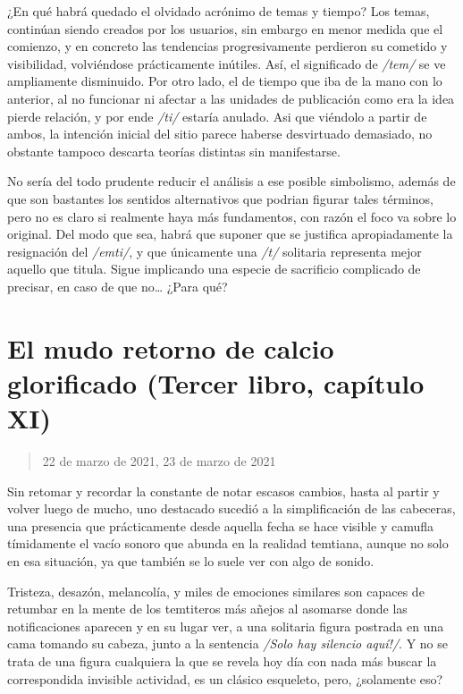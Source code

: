 \documentclass[
]{book}
\begin{document}
¿En qué habrá quedado el olvidado acrónimo de temas y tiempo? Los temas, continúan siendo creados por los usuarios, sin embargo en menor medida que el comienzo, y en concreto las tendencias progresivamente perdieron su cometido y visibilidad, volviéndose prácticamente inútiles. Así, el significado de \emph{/tem/} se ve ampliamente disminuido. Por otro lado, el de tiempo que iba de la mano con lo anterior, al no funcionar ni afectar a las unidades de publicación como era la idea pierde relación, y por ende \emph{/ti/} estaría anulado. Asi que viéndolo a partir de ambos, la intención inicial del sitio parece haberse desvirtuado demasiado, no obstante tampoco descarta teorías distintas sin manifestarse.

No sería del todo prudente reducir el análisis a ese posible simbolismo, además de que son bastantes los sentidos alternativos que podrian figurar tales términos, pero no es claro si realmente haya más fundamentos, con razón el foco va sobre lo original. Del modo que sea, habrá que suponer que se justifica apropiadamente la resignación del \emph{/emti/}, y que únicamente una \emph{/t/} solitaria representa mejor aquello que titula. Sigue implicando una especie de sacrificio complicado de precisar, en caso de que no\ldots{} ¿Para qué?

\hypertarget{el-mudo-retorno-de-calcio-glorificado-tercer-libro-capuxedtulo-xi}{%
\section{El mudo retorno de calcio glorificado (Tercer libro, capítulo XI)}\label{el-mudo-retorno-de-calcio-glorificado-tercer-libro-capuxedtulo-xi}}

\begin{quote}
22 de marzo de 2021, 23 de marzo de 2021
\end{quote}

Sin retomar y recordar la constante de notar escasos cambios, hasta al partir y volver luego de mucho, uno destacado sucedió a la simplificación de las cabeceras, una presencia que prácticamente desde aquella fecha se hace visible y camufla tímidamente el vacío sonoro que abunda en la realidad temtiana, aunque no solo en esa situación, ya que también se lo suele ver con algo de sonido.

Tristeza, desazón, melancolía, y miles de emociones similares son capaces de retumbar en la mente de los temtiteros más añejos al asomarse donde las notificaciones aparecen y en su lugar ver, a una solitaria figura postrada en una cama tomando su cabeza, junto a la sentencia \emph{/Solo hay silencio aquí!/}. Y no se trata de una figura cualquiera la que se revela hoy día con nada más buscar la correspondida invisible actividad, es un clásico esqueleto, pero, ¿solamente eso?
\end{document}
